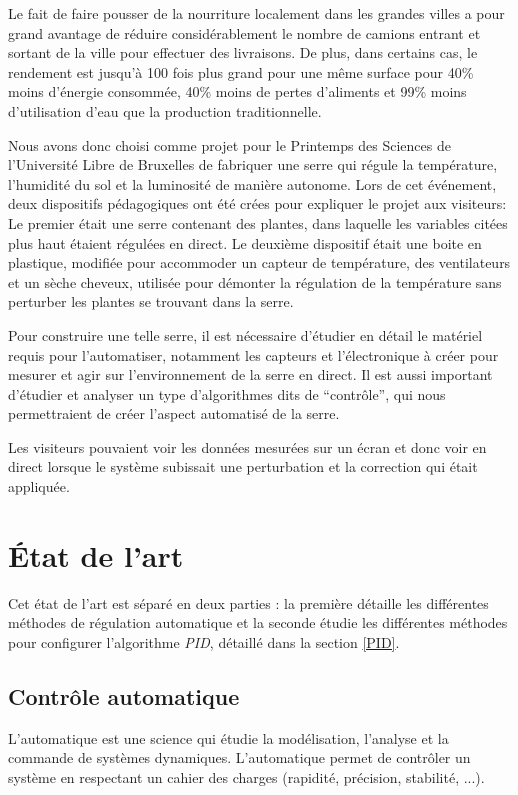\documentclass[a4paper,10pt]{report}
\begin{document}
Le fait de faire pousser de la nourriture localement dans les grandes villes a pour grand avantage de réduire considérablement le nombre de camions entrant et sortant de la ville pour effectuer des livraisons. De plus, dans certains cas, le rendement est jusqu'à 100 fois plus grand pour une même surface pour 40\% moins d'énergie consommée, 40\% moins de pertes d'aliments et 99\% moins d'utilisation d'eau que la production traditionnelle. \cite{GEReports}

Nous avons donc choisi comme projet pour le Printemps des Sciences de l'Université Libre de Bruxelles de fabriquer une serre qui régule la température, l'humidité du sol et la luminosité de manière autonome. Lors de cet événement, deux dispositifs pédagogiques ont été crées pour expliquer le projet aux visiteurs: Le premier était une serre contenant des plantes, dans laquelle les variables citées plus haut étaient régulées en direct. Le deuxième dispositif était une boite en plastique, modifiée pour accommoder un capteur de température, des ventilateurs et un sèche cheveux, utilisée pour démonter la régulation de la température sans perturber les plantes se trouvant dans la serre.

Pour construire une telle serre, il est nécessaire d'étudier en détail le matériel requis pour l'automatiser, notamment les capteurs et l'électronique à créer pour mesurer et agir sur l'environnement de la serre en direct.
Il est aussi important d'étudier et analyser un type d'algorithmes dits de ``contrôle'', qui nous permettraient de créer l'aspect automatisé de la serre.

Les visiteurs pouvaient voir les données mesurées sur un écran et donc voir en direct lorsque le système subissait une perturbation et la correction qui était appliquée.

\chapter{État de l'art}

Cet état de l'art est séparé en deux parties : la première détaille les différentes méthodes de régulation automatique et la seconde étudie les différentes méthodes pour configurer l'algorithme \emph{PID}, détaillé dans la section \ref{PID}.

\section{Contrôle automatique}
L’automatique est une science qui étudie la modélisation, l’analyse et la commande de systèmes dynamiques.
L’automatique permet de contrôler un système en respectant un cahier des charges (rapidité, précision, stabilité, ...).
\end{document}
